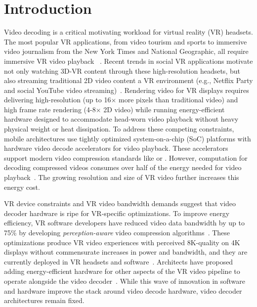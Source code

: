 \section{Introduction}

Video decoding is a critical motivating workload for virtual reality (VR) headsets.
The most popular VR applications, from \threesixty video tourism and sports to immersive video journalism from the New York Times and National Geographic, all require immersive VR video playback ~\cite{nytvr,nationalgeographic-vr}.
Recent trends in social VR applications motivate not only watching 3D-\threesixty VR content through these high-resolution headsets, but also streaming traditional 2D video content a VR environment (e.g., Netflix Party and social YouTube video streaming)~\cite{netflixparty}.
Rendering video for VR displays requires delivering high-resolution (up to 16$\times$ more pixels than traditional video) and high frame rate rendering (4-8$\times$ 2D video) while running energy-efficient hardware designed to accommodate head-worn video playback without heavy physical weight or heat dissipation.
To address these competing constraints, mobile architectures use tightly optimized system-on-a-chip (SoC) platforms with hardware video decode accelerators for video playback.
These accelerators support modern video compression standards like \hevc or \vpnine.
However, computation for decoding compressed videos consumes over half of the energy needed for video playback~\cite{google2018asplos,hevcThesis}.
The growing resolution and size of VR video further increases this energy cost.

\foveatedExampleFigure

VR device constraints and VR video bandwidth demands suggest that video decoder hardware is ripe for VR-specific optimizations.
To improve energy efficiency, VR software developers have reduced video data bandwidth by up to 75\% by developing \emph{perception-aware} video compression algorithms~\cite{guenter2012foveated,patney2017perceptual, visualcloud2017haynes,rubiks,fov-cloud-ryoo}.
These optimizations produce VR video experiences with perceived 8K-quality on 4K displays without commensurate increases in power and bandwidth, and they are currently deployed in VR headsets and software~\cite{htc-vive-pro-eye, patney2017perceptual, kaplanyan2019deepfovea}.
Architects have proposed adding energy-efficient hardware for other aspects of the VR video pipeline to operate alongside the video decoder~\cite{evr19isca, leng2018semantic, xie2018perception, zhang2017race}.
While this wave of innovation in software and hardware improve the stack around video decode hardware, video decoder architectures remain fixed.

